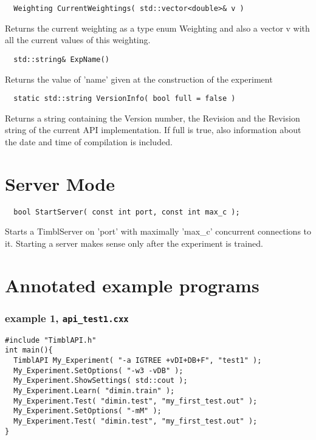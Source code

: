 \documentclass{report}
\begin{document}
\begin{footnotesize}
\begin{verbatim}
  Weighting CurrentWeightings( std::vector<double>& v )
\end{verbatim}
\end{footnotesize}

Returns the current weighting as a type enum Weighting and also a
vector v with all the current values of this weighting.

\begin{footnotesize}
\begin{verbatim}
  std::string& ExpName()
\end{verbatim}
\end{footnotesize}

Returns the value of 'name' given at the construction of the experiment

\begin{footnotesize}
\begin{verbatim}
  static std::string VersionInfo( bool full = false )
\end{verbatim}
\end{footnotesize}

Returns a string containing the Version number, the Revision and the
Revision string of the current API implementation. If full is true,
also information about the date and time of compilation is included.

\chapter{Server Mode}
\label{Using TiMBL as a Server}

\begin{footnotesize}
\begin{verbatim}
  bool StartServer( const int port, const int max_c );
\end{verbatim}
\end{footnotesize}

Starts a TimblServer on 'port' with maximally 'max\_c' concurrent
connections to it. Starting a server makes sense only after the
experiment is trained.

\clearpage
\chapter{Annotated example programs}

\subsection{example 1, {\tt api\_test1.cxx}}
\begin{footnotesize}
\begin{verbatim}	
#include "TimblAPI.h"
int main(){
  TimblAPI My_Experiment( "-a IGTREE +vDI+DB+F", "test1" );
  My_Experiment.SetOptions( "-w3 -vDB" );
  My_Experiment.ShowSettings( std::cout );
  My_Experiment.Learn( "dimin.train" );  
  My_Experiment.Test( "dimin.test", "my_first_test.out" );  
  My_Experiment.SetOptions( "-mM" );
  My_Experiment.Test( "dimin.test", "my_first_test.out" );  
}
\end{verbatim}
\end{footnotesize}
\end{document}
